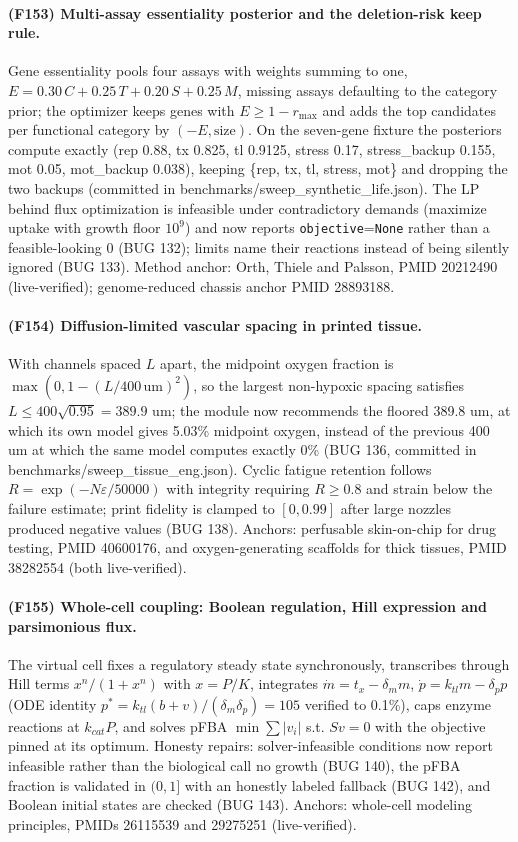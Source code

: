 \paragraph{(F153) Multi-assay essentiality posterior and the deletion-risk keep rule.} Gene essentiality pools four assays with weights summing to one, $E=0.30\,C+0.25\,T+0.20\,S+0.25\,M$, missing assays defaulting to the category prior; the optimizer keeps genes with $E\ge 1-r_{\max}$ and adds the top candidates per functional category by $(-E,\mathrm{size})$. On the seven-gene fixture the posteriors compute exactly (rep 0.88, tx 0.825, tl 0.9125, stress 0.17, stress\_backup 0.155, mot 0.05, mot\_backup 0.038), keeping \{rep, tx, tl, stress, mot\} and dropping the two backups (committed in benchmarks/sweep\_synthetic\_life.json). The LP behind flux optimization is infeasible under contradictory demands (maximize uptake with growth floor $10^9$) and now reports \texttt{objective}=\texttt{None} rather than a feasible-looking 0 (BUG 132); limits name their reactions instead of being silently ignored (BUG 133). Method anchor: Orth, Thiele and Palsson, PMID 20212490 (live-verified); genome-reduced chassis anchor PMID 28893188.
\paragraph{(F154) Diffusion-limited vascular spacing in printed tissue.} With channels spaced $L$ apart, the midpoint oxygen fraction is $\max(0,1-(L/400\,\mathrm{um})^2)$, so the largest non-hypoxic spacing satisfies $L\le 400\sqrt{0.95}=389.9$ um; the module now recommends the floored 389.8 um, at which its own model gives 5.03\% midpoint oxygen, instead of the previous 400 um at which the same model computes exactly 0\% (BUG 136, committed in benchmarks/sweep\_tissue\_eng.json). Cyclic fatigue retention follows $R=\exp(-N\varepsilon/50000)$ with integrity requiring $R\ge 0.8$ and strain below the failure estimate; print fidelity is clamped to $[0,0.99]$ after large nozzles produced negative values (BUG 138). Anchors: perfusable skin-on-chip for drug testing, PMID 40600176, and oxygen-generating scaffolds for thick tissues, PMID 38282554 (both live-verified).
\paragraph{(F155) Whole-cell coupling: Boolean regulation, Hill expression and parsimonious flux.} The virtual cell fixes a regulatory steady state synchronously, transcribes through Hill terms $x^{n}/(1+x^{n})$ with $x=P/K$, integrates $\dot m=t_x-\delta_m m$, $\dot p=k_{tl}m-\delta_p p$ (ODE identity $p^{*}=k_{tl}(b+v)/( \delta_m\delta_p)=105$ verified to 0.1\%), caps enzyme reactions at $k_{cat}P$, and solves pFBA $\min\sum|v_i|$ s.t. $Sv=0$ with the objective pinned at its optimum. Honesty repairs: solver-infeasible conditions now report infeasible rather than the biological call no growth (BUG 140), the pFBA fraction is validated in $(0,1]$ with an honestly labeled fallback (BUG 142), and Boolean initial states are checked (BUG 143). Anchors: whole-cell modeling principles, PMIDs 26115539 and 29275251 (live-verified).
